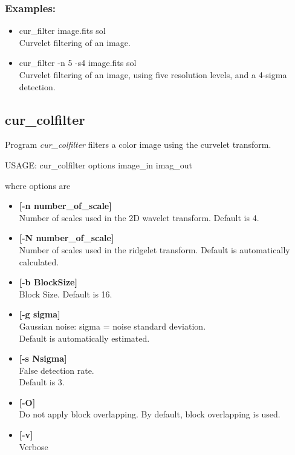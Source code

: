 \subsubsection*{Examples:}
\begin{itemize}
\item cur\_filter image.fits sol\\
Curvelet filtering of an image.
\item cur\_filter -n 5 -s4  image.fits sol\\
Curvelet filtering of an image, using five resolution levels, and
a 4-sigma detection.
\end{itemize}


\subsection{cur\_colfilter}

Program {\em cur\_colfilter} filters a
color image using the curvelet transform.
\begin{center}
 USAGE:  cur\_colfilter options image\_in imag\_out
\end{center}
where options are 
\begin{itemize}
\baselineskip=0.4truecm
\itemsep=0.1truecm
\item {\bf [-n number\_of\_scale]} \\
 Number of scales used in the 2D wavelet transform.
 Default is 4. 

\item {\bf [-N number\_of\_scale]} \\
 Number of scales used in the ridgelet transform.
 Default is automatically calculated.

\item {\bf [-b BlockSize]}  \\
Block Size. Default is 16.

\item {\bf [-g sigma]} \\
Gaussian noise: sigma = noise standard deviation.  \\
 Default is automatically estimated.

\item {\bf [-s Nsigma]} \\
False detection rate. \\
Default is 3.

\item {\bf [-O]}  \\
Do not apply block overlapping. By default, block overlapping is used.

\item {\bf [-v]} \\
Verbose
\end{itemize}

